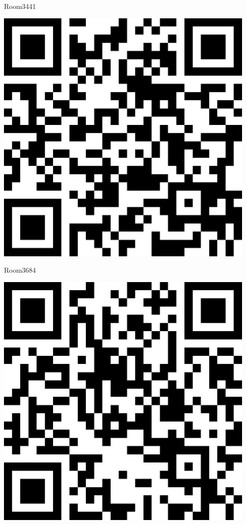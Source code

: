\documentclass[letterpaper]{article}
\begin{document}
 \hfill{\small Room3441} 

 \vspace{1in} 
 \pagebreak 
{} 
 \vspace*{\fill} 
 \begingroup 
 \centerline{\includegraphics[scale=1,width=5in,height=5in]{Room3684.png}} 
 \endgroup 
 \vspace*{\fill} 

 \hfill{\small Room3684} 

 \vspace{1in} 
 \pagebreak 
{} 
 \vspace*{\fill} 
 \begingroup 
 \centerline{\includegraphics[scale=1,width=5in,height=5in]{Room3688.png}} 
 \endgroup 
 \vspace*{\fill} 
\end{document}
